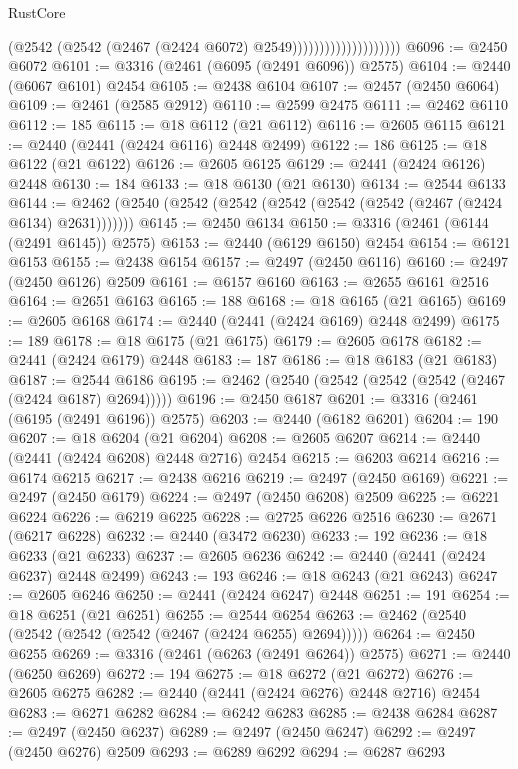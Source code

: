 \begin{lexlean}{RustCore}
\begin{coremodule}
                                      (@2542 (@2542 (@2467 (@2424 @6072) @2549))))))))))))))))))))
@6096 := @2450 @6072
@6101 := @3316 (@2461 (@6095 (@2491 @6096)) @2575)
@6104 := @2440 (@6067 @6101) @2454
@6105 := @2438 @6104
@6107 := @2457 (@2450 @6064)
@6109 := @2461 (@2585 @2912)
@6110 := @2599 @2475
@6111 := @2462 @6110
@6112 := 185
@6115 := @18 @6112 (@21 @6112)
@6116 := @2605 @6115
@6121 := @2440 (@2441 (@2424 @6116) @2448 @2499)
@6122 := 186
@6125 := @18 @6122 (@21 @6122)
@6126 := @2605 @6125
@6129 := @2441 (@2424 @6126) @2448
@6130 := 184
@6133 := @18 @6130 (@21 @6130)
@6134 := @2544 @6133
@6144 := @2462 (@2540 (@2542 (@2542 (@2542 (@2542 (@2542 (@2467 (@2424 @6134) @2631)))))))
@6145 := @2450 @6134
@6150 := @3316 (@2461 (@6144 (@2491 @6145)) @2575)
@6153 := @2440 (@6129 @6150) @2454
@6154 := @6121 @6153
@6155 := @2438 @6154
@6157 := @2497 (@2450 @6116)
@6160 := @2497 (@2450 @6126) @2509
@6161 := @6157 @6160
@6163 := @2655 @6161 @2516
@6164 := @2651 @6163
@6165 := 188
@6168 := @18 @6165 (@21 @6165)
@6169 := @2605 @6168
@6174 := @2440 (@2441 (@2424 @6169) @2448 @2499)
@6175 := 189
@6178 := @18 @6175 (@21 @6175)
@6179 := @2605 @6178
@6182 := @2441 (@2424 @6179) @2448
@6183 := 187
@6186 := @18 @6183 (@21 @6183)
@6187 := @2544 @6186
@6195 := @2462 (@2540 (@2542 (@2542 (@2542 (@2467 (@2424 @6187) @2694)))))
@6196 := @2450 @6187
@6201 := @3316 (@2461 (@6195 (@2491 @6196)) @2575)
@6203 := @2440 (@6182 @6201)
@6204 := 190
@6207 := @18 @6204 (@21 @6204)
@6208 := @2605 @6207
@6214 := @2440 (@2441 (@2424 @6208) @2448 @2716) @2454
@6215 := @6203 @6214
@6216 := @6174 @6215
@6217 := @2438 @6216
@6219 := @2497 (@2450 @6169)
@6221 := @2497 (@2450 @6179)
@6224 := @2497 (@2450 @6208) @2509
@6225 := @6221 @6224
@6226 := @6219 @6225
@6228 := @2725 @6226 @2516
@6230 := @2671 (@6217 @6228)
@6232 := @2440 (@3472 @6230)
@6233 := 192
@6236 := @18 @6233 (@21 @6233)
@6237 := @2605 @6236
@6242 := @2440 (@2441 (@2424 @6237) @2448 @2499)
@6243 := 193
@6246 := @18 @6243 (@21 @6243)
@6247 := @2605 @6246
@6250 := @2441 (@2424 @6247) @2448
@6251 := 191
@6254 := @18 @6251 (@21 @6251)
@6255 := @2544 @6254
@6263 := @2462 (@2540 (@2542 (@2542 (@2542 (@2467 (@2424 @6255) @2694)))))
@6264 := @2450 @6255
@6269 := @3316 (@2461 (@6263 (@2491 @6264)) @2575)
@6271 := @2440 (@6250 @6269)
@6272 := 194
@6275 := @18 @6272 (@21 @6272)
@6276 := @2605 @6275
@6282 := @2440 (@2441 (@2424 @6276) @2448 @2716) @2454
@6283 := @6271 @6282
@6284 := @6242 @6283
@6285 := @2438 @6284
@6287 := @2497 (@2450 @6237)
@6289 := @2497 (@2450 @6247)
@6292 := @2497 (@2450 @6276) @2509
@6293 := @6289 @6292
@6294 := @6287 @6293

\end{coremodule}
\end{lexlean}
